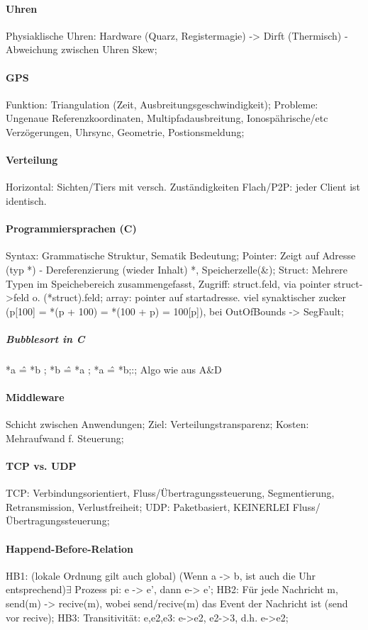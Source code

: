 \documentclass[pagesize,11pt,a4paper]{scrartcl}
\begin{document}
\paragraph*{Uhren}
	Physiaklische Uhren: Hardware (Quarz, Registermagie) -> Dirft (Thermisch) - Abweichung zwischen Uhren Skew;

\paragraph*{GPS}
	Funktion: Triangulation (Zeit, Ausbreitungsgeschwindigkeit);
	Probleme: Ungenaue Referenzkoordinaten, Multipfadausbreitung, Ionospährische/etc Verzögerungen, Uhrsync, Geometrie, Postionsmeldung;
	
\paragraph*{Verteilung}
	Horizontal: Sichten/Tiers mit versch. Zuständigkeiten
	Flach/P2P: jeder Client ist identisch.

\paragraph*{Programmiersprachen (C)}
	Syntax: Grammatische Struktur, Sematik Bedeutung;
	Pointer: Zeigt auf Adresse (typ *) - Dereferenzierung (wieder Inhalt) *, Speicherzelle(\&);
	Struct: Mehrere Typen im Speichebereich zusammengefasst, Zugriff: struct.feld, via pointer struct->feld o. (*struct).feld;
	array: pointer auf startadresse. viel synaktischer zucker (p[100] = *(p + 100) = *(100 + p) = 100[p]), bei OutOfBounds -> SegFault;

\subparagraph*{Bubblesort in C}
	*a \^= *b ; *b \^= *a ; *a \^= *b;:;
	Algo wie aus A\&D

\paragraph*{Middleware}
	Schicht zwischen Anwendungen;
	Ziel: Verteilungstransparenz;
	Kosten: Mehraufwand f. Steuerung;

\paragraph*{TCP vs. UDP}
	TCP: Verbindungsorientiert, Fluss/Übertragungssteuerung, Segmentierung, Retransmission, Verlustfreiheit;
	UDP: Paketbasiert, KEINERLEI Fluss/Übertragungssteuerung;
	
\paragraph*{Happend-Before-Relation}
	HB1: (lokale Ordnung gilt auch global) (Wenn a -> b, ist auch die Uhr entsprechend)$\exists$ Prozess pi: e -> e', dann e-> e';
	HB2: Für jede Nachricht m, send(m) -> recive(m), wobei send/recive(m) das Event der Nachricht ist (send vor recive);
	HB3: Transitivität: e,e2,e3: e->e2, e2->3, d.h. e->e2;
\end{document}
